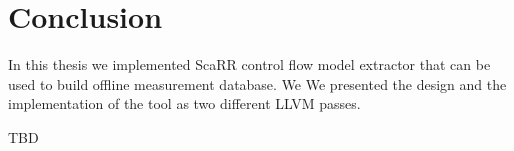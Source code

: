
\chapter{Conclusion} %

\label{Chapter7} %

In this thesis we implemented ScaRR control flow model extractor that can be
used to build offline measurement database. We We presented the design and the
implementation of the tool as two different LLVM passes.

TBD